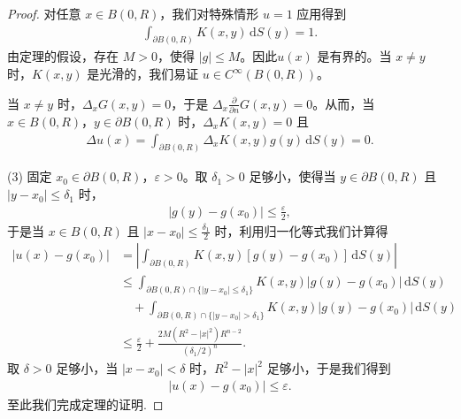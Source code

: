 \documentclass[../../main.tex]{subfiles}%
\begin{document}
\begin{proof}

对任意 $x\in B(0,R)$，我们对特殊情形 $u=1$ 应用得到
\begin{align*}
\int_{\partial B(0,R)} K(x,y)\,\mathrm{d}S(y) = 1.
\end{align*}
由定理的假设，存在 $M>0$，使得 $|g|\leqslant M$。因此$u(x)$ 是有界的。当 $x\neq y$ 时，$K(x,y)$ 是光滑的，我们易证 $u\in C^\infty(B(0,R))$。

当 $x\neq y$ 时，$\Delta_x G(x,y)=0$，于是 $\Delta_x \frac{\partial}{\partial n}G(x,y)=0$。从而，当 $x\in B(0,R)$，$y\in\partial B(0,R)$ 时，$\Delta_x K(x,y)=0$ 且
\begin{align*}
\Delta u(x) = \int_{\partial B(0,R)} \Delta_x K(x,y)g(y)\,\mathrm{d}S(y) = 0.
\end{align*}

(3) 固定 $x_0\in\partial B(0,R)$，$\varepsilon>0$。取 $\delta_1>0$ 足够小，使得当 $y\in\partial B(0,R)$ 且 $|y-x_0|\leqslant \delta_1$ 时，
\begin{align*}
|g(y)-g(x_0)| \leqslant \frac{\varepsilon}{2},
\end{align*}
于是当 $x\in B(0,R)$ 且 $|x-x_0|\leqslant \frac{\delta_1}{2}$ 时，利用归一化等式我们计算得
\begin{align*}
|u(x)-g(x_0)| &= \left| \int_{\partial B(0,R)} K(x,y)[g(y)-g(x_0)]\,\mathrm{d}S(y) \right| \\
&\leqslant \int_{\partial B(0,R)\cap\{|y-x_0|\leqslant \delta_1\}} K(x,y)|g(y)-g(x_0)|\,\mathrm{d}S(y) \\
&\quad + \int_{\partial B(0,R)\cap\{|y-x_0|>\delta_1\}} K(x,y)|g(y)-g(x_0)|\,\mathrm{d}S(y) \\
&\leqslant \frac{\varepsilon}{2} + \frac{2M(R^2-|x|^2)R^{n-2}}{(\delta_1/2)^n}.
\end{align*}
取 $\delta>0$ 足够小，当 $|x-x_0|<\delta$ 时，$R^2-|x|^2$ 足够小，于是我们得到
\begin{align*}
|u(x)-g(x_0)| \leqslant \varepsilon.
\end{align*}
至此我们完成定理的证明.
\end{proof}
\end{document}
